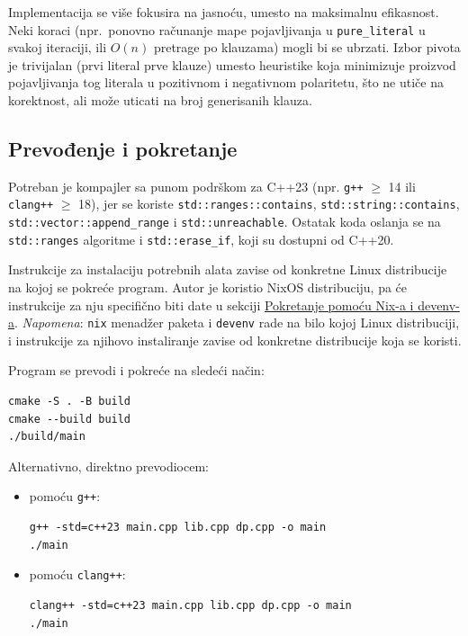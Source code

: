 \documentclass[a4paper,10pt]{article}
\begin{document}
Implementacija se više fokusira na jasnoću, umesto na maksimalnu efikasnost. Neki koraci (npr.\ ponovno računanje mape pojavljivanja u \verb|pure_literal| u svakoj iteraciji, ili $O(n)$ pretrage po klauzama) mogli bi se ubrzati. Izbor pivota je trivijalan (prvi literal prve klauze) umesto heuristike koja minimizuje proizvod pojavljivanja tog literala u pozitivnom i negativnom polaritetu, što ne utiče na korektnost, ali može uticati na broj generisanih klauza.

\subsection{Prevođenje i pokretanje}

Potreban je kompajler sa punom podrškom za C++23 (npr. \verb|g++| $\ge$ 14 ili \verb|clang++| $\ge$ 18), jer se koriste \verb|std::ranges::contains|, \verb|std::string::contains|, \verb|std::vector::append_range| i \verb|std::unreachable|. Ostatak koda oslanja se na \verb|std::ranges| algoritme i \verb|std::erase_if|, koji su dostupni od C++20.


Instrukcije za instalaciju potrebnih alata zavise od konkretne Linux distribucije na kojoj se pokreće program.
Autor je koristio NixOS distribuciju, pa će instrukcije za nju specifično biti date u sekciji \hyperref[subsec:nix]{Pokretanje pomoću Nix-a i devenv-a}.
\emph{Napomena}: \verb|nix| menadžer paketa i \verb|devenv| rade na bilo kojoj Linux distribuciji, i instrukcije za njihovo instaliranje zavise od konkretne distribucije koja se koristi.

Program se prevodi i pokreće na sledeći način:

\begin{verbatim}
cmake -S . -B build
cmake --build build
./build/main
\end{verbatim} 

\newpage
Alternativno, direktno prevodiocem:

\begin{itemize}
  \item pomoću \verb|g++|:
\begin{verbatim}
g++ -std=c++23 main.cpp lib.cpp dp.cpp -o main
./main
\end{verbatim}

  \item pomoću \verb|clang++|:
\begin{verbatim}
clang++ -std=c++23 main.cpp lib.cpp dp.cpp -o main
./main
\end{verbatim}
\end{itemize}
\end{document}
